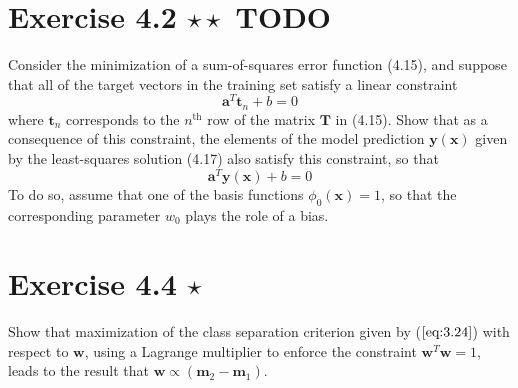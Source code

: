 \section*{Exercise 4.2 $\star \star$ \bf TODO} 
Consider the minimization of a sum-of-squares error
function (4.15), and suppose that all of the 
target vectors in the training set satisfy a linear constraint
\begin{equation*}
    \mathbf{a}^T\mathbf{t}_n + b = 0
    \tag{4.157}\label{eq:4.157}
\end{equation*}
where $\mathbf{t}_n$ corresponds to the $n^\text{th}$ row of the matrix $\mathbf{T}$
in (4.15). Show that as a consequence of this constraint,
the elements of the model prediction $\mathbf{y}(\mathbf{x})$ given
by the least-squares solution (4.17) also satisfy
this constraint, so that
\begin{equation*}
    \mathbf{a}^T\mathbf{y}(\mathbf{x}) + b = 0
    \tag{4.158}\label{eq:4.158}
\end{equation*}
To do so, assume that one of the basis functions $\phi_0(\mathbf{x}) = 1$,
so that the corresponding parameter $w_0$ plays the role of a bias.

\section*{Exercise 4.4 $\star$}
Show that maximization of the class separation criterion given by
($\ref{eq:3.24}$) with respect to $\mathbf{w}$, using a Lagrange multiplier
to enforce the constraint $\mathbf{w}^T\mathbf{w} = 1$, leads to the
result that $\mathbf{w} \propto (\mathbf{m}_2 - \mathbf{m}_1)$.

\vspace{1em}

